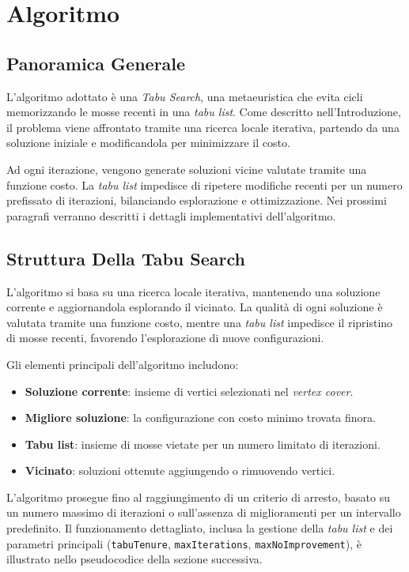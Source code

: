 \section{Algoritmo}
\label{sec:Algoritmo}

\subsection{Panoramica Generale}

L'algoritmo adottato è una \textit{Tabu Search}, una metaeuristica che evita cicli memorizzando le mosse recenti in una \textit{tabu list}. Come descritto nell'Introduzione, il problema viene affrontato tramite una ricerca locale iterativa, partendo da una soluzione iniziale e modificandola per minimizzare il costo.

Ad ogni iterazione, vengono generate soluzioni vicine valutate tramite una funzione costo. La \textit{tabu list} impedisce di ripetere modifiche recenti per un numero prefissato di iterazioni, bilanciando esplorazione e ottimizzazione. Nei prossimi paragrafi verranno descritti i dettagli implementativi dell’algoritmo.

\subsection{Struttura Della Tabu Search}
\label{sec:TabuSearch}

L'algoritmo si basa su una ricerca locale iterativa, mantenendo una soluzione corrente e aggiornandola esplorando il vicinato. La qualità di ogni soluzione è valutata tramite una funzione costo, mentre una \textit{tabu list} impedisce il ripristino di mosse recenti, favorendo l'esplorazione di nuove configurazioni.

Gli elementi principali dell'algoritmo includono:
\begin{itemize}
    \item \textbf{Soluzione corrente}: insieme di vertici selezionati nel \textit{vertex cover}.
    \item \textbf{Migliore soluzione}: la configurazione con costo minimo trovata finora.
    \item \textbf{Tabu list}: insieme di mosse vietate per un numero limitato di iterazioni.
    \item \textbf{Vicinato}: soluzioni ottenute aggiungendo o rimuovendo vertici.
\end{itemize}

L'algoritmo prosegue fino al raggiungimento di un criterio di arresto, basato su un numero massimo di iterazioni o sull'assenza di miglioramenti per un intervallo predefinito. Il funzionamento dettagliato, inclusa la gestione della \textit{tabu list} e dei parametri principali (\texttt{tabuTenure}, \texttt{maxIterations}, \texttt{maxNoImprovement}), è illustrato nello pseudocodice della sezione successiva.

